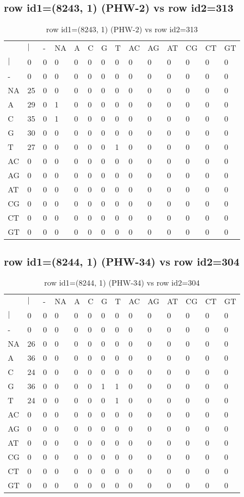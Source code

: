 \subsection{row id1=(8243, 1) (PHW-2) vs row id2=313}
\begin{center}
\begin{longtable}{|l|l|l|l|l|l|l|l|l|l|l|l|l|l|}
\caption{row id1=(8243, 1) (PHW-2) vs row id2=313} \label{table_dm376}\\
\hline
\\
\hline
&$|$&-&NA&A&C&G&T&AC&AG&AT&CG&CT&GT\\
$|$&0&0&0&0&0&0&0&0&0&0&0&0&0\\
-&0&0&0&0&0&0&0&0&0&0&0&0&0\\
NA&25&0&0&0&0&0&0&0&0&0&0&0&0\\
A&29&0&1&0&0&0&0&0&0&0&0&0&0\\
C&35&0&1&0&0&0&0&0&0&0&0&0&0\\
G&30&0&0&0&0&0&0&0&0&0&0&0&0\\
T&27&0&0&0&0&0&1&0&0&0&0&0&0\\
AC&0&0&0&0&0&0&0&0&0&0&0&0&0\\
AG&0&0&0&0&0&0&0&0&0&0&0&0&0\\
AT&0&0&0&0&0&0&0&0&0&0&0&0&0\\
CG&0&0&0&0&0&0&0&0&0&0&0&0&0\\
CT&0&0&0&0&0&0&0&0&0&0&0&0&0\\
GT&0&0&0&0&0&0&0&0&0&0&0&0&0\\
\hline
\end{longtable}
\end{center}

\subsection{row id1=(8244, 1) (PHW-34) vs row id2=304}
\begin{center}
\begin{longtable}{|l|l|l|l|l|l|l|l|l|l|l|l|l|l|}
\caption{row id1=(8244, 1) (PHW-34) vs row id2=304} \label{table_dm378}\\
\hline
\\
\hline
&$|$&-&NA&A&C&G&T&AC&AG&AT&CG&CT&GT\\
$|$&0&0&0&0&0&0&0&0&0&0&0&0&0\\
-&0&0&0&0&0&0&0&0&0&0&0&0&0\\
NA&26&0&0&0&0&0&0&0&0&0&0&0&0\\
A&36&0&0&0&0&0&0&0&0&0&0&0&0\\
C&24&0&0&0&0&0&0&0&0&0&0&0&0\\
G&36&0&0&0&0&1&1&0&0&0&0&0&0\\
T&24&0&0&0&0&0&1&0&0&0&0&0&0\\
AC&0&0&0&0&0&0&0&0&0&0&0&0&0\\
AG&0&0&0&0&0&0&0&0&0&0&0&0&0\\
AT&0&0&0&0&0&0&0&0&0&0&0&0&0\\
CG&0&0&0&0&0&0&0&0&0&0&0&0&0\\
CT&0&0&0&0&0&0&0&0&0&0&0&0&0\\
GT&0&0&0&0&0&0&0&0&0&0&0&0&0\\
\hline
\end{longtable}
\end{center}

